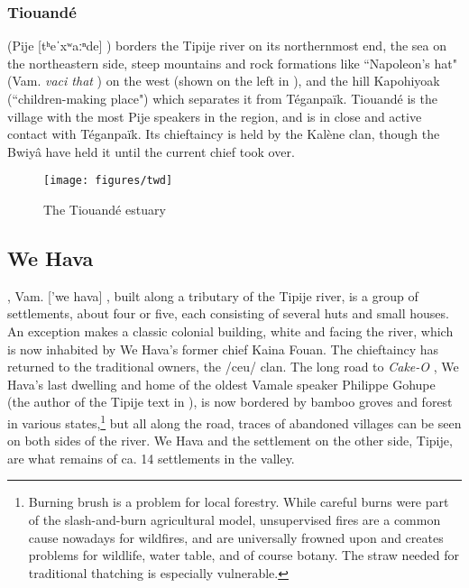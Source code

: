 \subsubsection{Tiouandé}\largerpage[2.25]
 (Pije [tʰeˈxʷaːⁿde] ) borders the Tipije river on its northernmost end, the sea on the northeastern side, steep mountains and rock formations like ``Napoleon's hat" (Vam. \textit{vaci that} ) on the west (shown on the left in ), and the hill Kapohiyoak (``children-making place") %
which separates it from Téganpaïk. Tiouandé is the village with the most Pije speakers in the region, and is in close and active contact with Téganpaïk. Its chieftaincy is held by the Kalène clan, though the Bwiyâ have held it until the current chief took over. %

\begin{figure}
	\texttt{[image: figures/twd]}
	\caption{The Tiouandé estuary}
	\label{fig:twd}
\end{figure}

\subsection{We Hava}\largerpage[2]
, Vam. ['we hava] , %
built along a tributary of the Tipije river, is a group of settlements, about four or five, each consisting of several huts and small houses. An exception makes a classic colonial building, white and facing the river, which is now inhabited by We Hava's former chief Kaina Fouan. The chieftaincy has returned to the traditional owners, the  /ceu/ clan. The long road to \textit{Cake-O} , We Hava's last dwelling and home of the oldest Vamale speaker Philippe Gohupe (the author of the Tipije text in ), is now bordered by bamboo groves and forest in various states,{\footnote{Burning brush is a problem for local forestry. While careful burns were part of the slash-and-burn agricultural model, unsupervised fires are a common cause nowadays for wildfires, and are universally frowned upon and creates problems for wildlife, water table, and of course botany. The straw needed for traditional thatching is especially vulnerable.}} but all along the road, traces of abandoned villages can be seen on both sides of the river. We Hava and the settlement on the other side, Tipije, are what remains of ca. 14 settlements in the valley.

